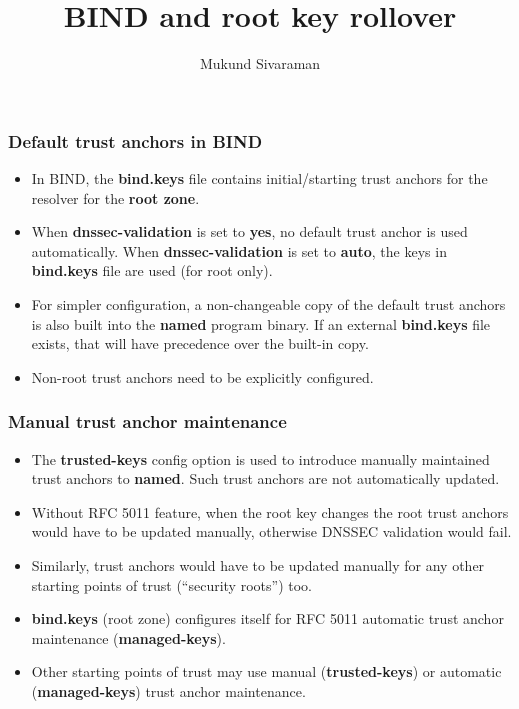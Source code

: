 \documentclass{beamer}
\title{BIND and root key rollover}
\author{Mukund Sivaraman}
\institute{Internet Systems Consortium}
\date{}
\begin{document}
\frame{\titlepage}

\frame
{
  \frametitle{Default trust anchors in BIND}

  \begin{itemize}

  \item In BIND, the \textbf{bind.keys} file contains initial/starting
    trust anchors for the resolver for the \textbf{root zone}.

  \item When \textbf{dnssec-validation} is set to \textbf{yes}, no
    default trust anchor is used automatically. When
    \textbf{dnssec-validation} is set to \textbf{auto}, the keys in
    \textbf{bind.keys} file are used (for root only).

  \item For simpler configuration, a non-changeable copy of the default
    trust anchors is also built into the \textbf{named} program
    binary. If an external \textbf{bind.keys} file exists, that will
    have precedence over the built-in copy.

  \item Non-root trust anchors need to be explicitly configured.

  \end{itemize}
}

\frame
{
  \frametitle{Manual trust anchor maintenance}

  \begin{itemize}
  \item The \textbf{trusted-keys} config option is used to introduce
    manually maintained trust anchors to \textbf{named}. Such trust
    anchors are not automatically updated.

  \item Without RFC 5011 feature, when the root key changes the root
    trust anchors would have to be updated manually, otherwise DNSSEC
    validation would fail.

  \item Similarly, trust anchors would have to be updated manually for
    any other starting points of trust (``security roots'') too.

  \item \textbf{bind.keys} (root zone) configures itself for RFC 5011
    automatic trust anchor maintenance (\textbf{managed-keys}).

  \item Other starting points of trust may use manual
    (\textbf{trusted-keys}) or automatic (\textbf{managed-keys}) trust
    anchor maintenance.

  \end{itemize}
}
\end{document}
